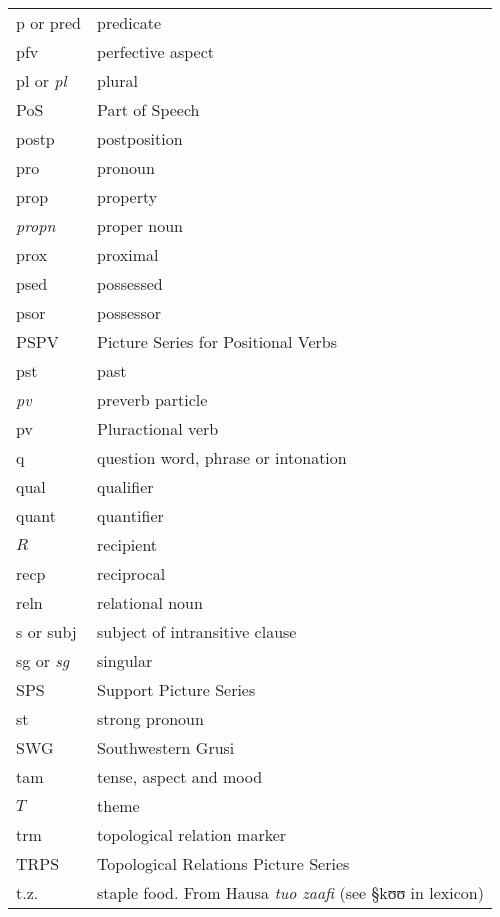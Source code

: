 \begin{xtabular}{ll}
 
{\sc p} or  {\sc pred} & predicate\\
{\sc pfv} & perfective aspect \\%
{\sc pl} or {\it pl} &  plural \\
PoS & Part of Speech\\
 {\sc postp} & postposition \\
{\sc pro} & pronoun \\ %
 {\sc prop} & property  \\ %
 {\it propn} & proper noun  \\ %
 {\sc prox} & proximal \\
{\sc psed} & possessed\\ 
{\sc psor} & possessor\\
PSPV&  Picture Series for Positional Verbs \\
{\sc pst} & past  \\

 {\it pv} & preverb particle \\
 {\sc pv} &Pluractional verb \\



{\sc q} & question word, phrase or intonation\\
{\sc qual} &  qualifier\\
{\sc quant} &  quantifier\\


$R$ & recipient \\ 
 {\sc recp} & reciprocal \\
 {\sc reln} & relational noun \\

{\sc s} or {\sc subj}& subject of intransitive clause\\
{\sc sg} or {\it sg}  & singular \\  
SPS & Support  Picture Series\\
{\sc st} &strong pronoun\\
SWG & Southwestern Grusi\\

{\sc tam} & tense, aspect and mood \\
$T$ & theme \\  
{\sc trm} & topological relation marker \\
TRPS& Topological Relations Picture Series\\
t.z. & staple food. From Hausa {\it  tuo zaafi} (see {\S kʊʊ} in lexicon)\\


\end{xtabular}
